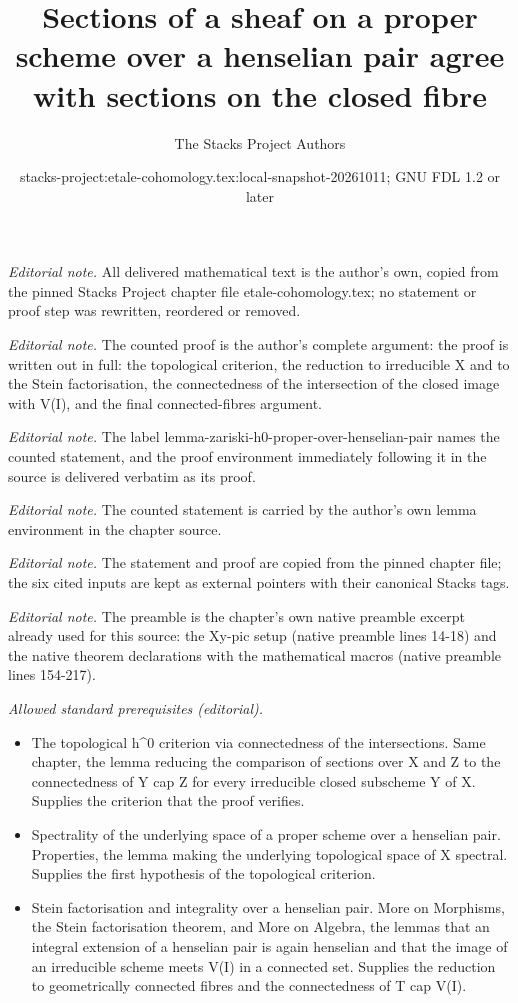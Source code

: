 \documentclass[10pt,a4paper]{amsart}
\title{Sections of a sheaf on a proper scheme over a henselian pair agree with sections on the closed fibre}
\author{The Stacks Project Authors}
\date{stacks-project:etale-cohomology.tex:local-snapshot-20261011; GNU FDL 1.2 or later}
\theoremstyle{plain}
\theoremstyle{definition}
\theoremstyle{remark}
\numberwithin{equation}{subsection}
\begin{document}
\maketitle
\noindent\textit{Editorial note.} All delivered mathematical text is the author's own, copied from the pinned Stacks Project chapter file etale-cohomology.tex; no statement or proof step was rewritten, reordered or removed.\par\medskip
\noindent\textit{Editorial note.} The counted proof is the author's complete argument: the proof is written out in full: the topological criterion, the reduction to irreducible X and to the Stein factorisation, the connectedness of the intersection of the closed image with V(I), and the final connected-fibres argument.\par\medskip
\noindent\textit{Editorial note.} The label lemma-zariski-h0-proper-over-henselian-pair names the counted statement, and the proof environment immediately following it in the source is delivered verbatim as its proof.\par\medskip
\noindent\textit{Editorial note.} The counted statement is carried by the author's own lemma environment in the chapter source.\par\medskip
\noindent\textit{Editorial note.} The statement and proof are copied from the pinned chapter file; the six cited inputs are kept as external pointers with their canonical Stacks tags.\par\medskip
\noindent\textit{Editorial note.} The preamble is the chapter's own native preamble excerpt already used for this source: the Xy-pic setup (native preamble lines 14-18) and the native theorem declarations with the mathematical macros (native preamble lines 154-217).\par\medskip
\noindent\textit{Allowed standard prerequisites (editorial).}\begin{itemize}
\item The topological h\textasciicircum{}0 criterion via connectedness of the intersections. Same chapter, the lemma reducing the comparison of sections over X and Z to the connectedness of Y cap Z for every irreducible closed subscheme Y of X. Supplies the criterion that the proof verifies.
\item Spectrality of the underlying space of a proper scheme over a henselian pair. Properties, the lemma making the underlying topological space of X spectral. Supplies the first hypothesis of the topological criterion.
\item Stein factorisation and integrality over a henselian pair. More on Morphisms, the Stein factorisation theorem, and More on Algebra, the lemmas that an integral extension of a henselian pair is again henselian and that the image of an irreducible scheme meets V(I) in a connected set. Supplies the reduction to geometrically connected fibres and the connectedness of T cap V(I).
\end{itemize}\medskip
\end{document}
